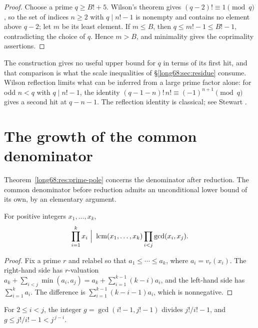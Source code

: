 \documentclass[11pt]{article}
\begin{document}
\begin{proof}
Choose a prime $q\ge B!+5$.  Wilson's theorem gives $(q-2)!\equiv1\pmod q$,
so the set of indices $n\ge2$ with $q\mid n!-1$ is nonempty and contains no
element above $q-2$; let $m$ be its least element.  If $m\le B$, then
$q\le m!-1\le B!-1$, contradicting the choice of $q$.  Hence $m>B$, and
minimality gives the coprimality assertions.
\end{proof}

The construction gives no useful upper bound for $q$ in terms of its first
hit, and that comparison is what the scale inequalities of
\S\ref{long68:sec:residue} consume.  Wilson reflection limits what can be inferred
from a large prime factor alone: for odd $n<q$ with $q\mid n!-1$, the
identity $(q-1-n)!\,n!\equiv(-1)^{n+1}\pmod q$ gives a second hit at
$q-n-1$.  The reflection identity is classical; see Stewart
\cite[p.~462, (4)]{stewart2004}.

\statusboundary

\section{The growth of the common denominator}\label{long68:sec:lcm}

Theorem~\ref{long68:res:prime-pole} concerns the denominator after reduction.  The
common denominator before reduction admits an unconditional lower bound of
its own, by an elementary argument.

\begin{lemma}
\label{long68:res:product-lcm}
For positive integers $x_1,\ldots,x_k$,
\[
 \prod_{i=1}^{k}x_i\ \Big|\ \lcm(x_1,\ldots,x_k)\prod_{i<j}\gcd(x_i,x_j).
\]
\end{lemma}

\begin{proof}
Fix a prime $r$ and relabel so that $a_1\le\cdots\le a_k$, where
$a_i=v_r(x_i)$.  The right-hand side has $r$-valuation
$a_k+\sum_{i<j}\min(a_i,a_j)=a_k+\sum_{i=1}^{k-1}(k-i)a_i$, and the left-hand
side has $\sum_{i=1}^{k}a_i$.  The difference is
$\sum_{i=1}^{k-1}(k-i-1)a_i$, which is nonnegative.
\end{proof}

\begin{lemma}\label{long68:res:gap-gcd}
For $2\le i<j$, the integer $g=\gcd(i!-1,j!-1)$ divides $j!/i!-1$, and
$g\le j!/i!-1<j^{\,j-i}$.
\end{lemma}
\end{document}
